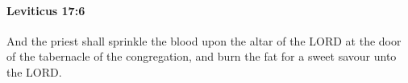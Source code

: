 
		\paragraph{Leviticus 17:6} %
			\label{LEVITICUS-17-6}

			And the priest shall sprinkle the blood upon the altar of the LORD at the door of the tabernacle of the congregation, and burn the fat for a sweet savour unto the LORD.


